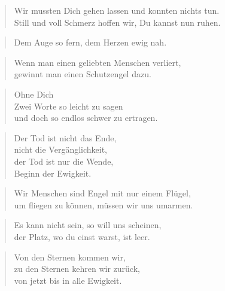 \documentclass[ngerman,a4paper,11pt]{scrreprt}
\begin{document}
\begin{verse}
Wir mussten Dich gehen lassen und konnten nichts tun. \\
Still und voll Schmerz hoffen wir, Du kannst nun ruhen. \\
\end{verse}

\begin{verse}
Dem Auge so fern, dem Herzen ewig nah. \\
\end{verse}

\begin{verse}
Wenn man einen geliebten Menschen verliert, \\
gewinnt man einen Schutzengel dazu. \\
\end{verse}

\begin{verse}
Ohne Dich \\
Zwei Worte so leicht zu sagen \\
und doch so endlos schwer zu ertragen. \\
\end{verse}

\begin{verse}
Der Tod ist nicht das Ende, \\
nicht die Vergänglichkeit, \\
der Tod ist nur die Wende, \\
Beginn der Ewigkeit. \\
\end{verse}

\begin{verse}
Wir Menschen sind Engel mit nur einem Flügel, \\
um fliegen zu können, müssen wir uns umarmen. \\
\end{verse}

\begin{verse}
Es kann nicht sein, so will uns scheinen, \\
der Platz, wo du einst warst, ist leer. \\
\end{verse}

\begin{verse}
Von den Sternen kommen wir, \\
zu den Sternen kehren wir zurück, \\
von jetzt bis in alle Ewigkeit. \\
\end{verse}
\end{document}
